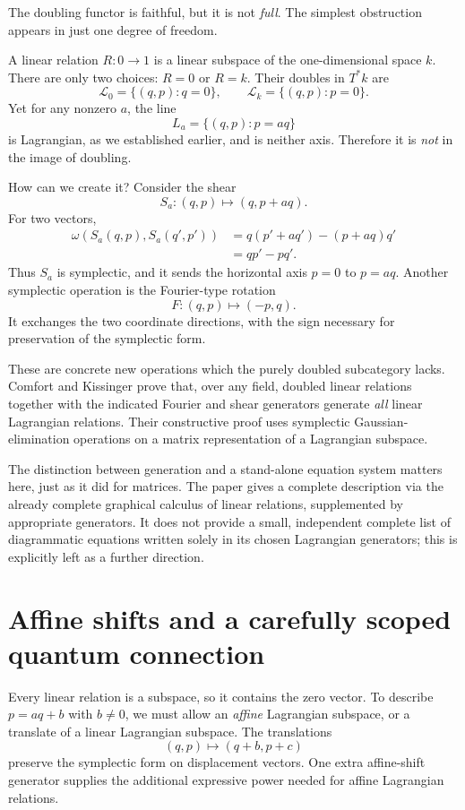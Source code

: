 The doubling functor is faithful, but it is not \emph{full}. The simplest obstruction appears in just one degree of freedom.

A linear relation \(R:0\to1\) is a linear subspace of the one-dimensional space \(k\). There are only two choices: \(R=0\) or \(R=k\). Their doubles in \(T^*k\) are
\[
 \mathcal L_{0}=\{(q,p):q=0\},\qquad
 \mathcal L_k=\{(q,p):p=0\}.
\]
Yet for any nonzero \(a\), the line
\[
 L_a=\{(q,p):p=aq\}
\]
is Lagrangian, as we established earlier, and is neither axis. Therefore it is \emph{not} in the image of doubling.

How can we create it? Consider the shear
\[
 S_a:(q,p)\longmapsto(q,p+aq).
\]
For two vectors,
\[
 \begin{aligned}
 \omega(S_a(q,p),S_a(q',p'))
 &=q(p'+aq')-(p+aq)q'\\
 &=qp'-pq'.
 \end{aligned}
\]
Thus \(S_a\) is symplectic, and it sends the horizontal axis \(p=0\) to \(p=aq\). Another symplectic operation is the Fourier-type rotation
\[
 F:(q,p)\longmapsto(-p,q).
\]
It exchanges the two coordinate directions, with the sign necessary for preservation of the symplectic form.

These are concrete new operations which the purely doubled subcategory lacks. Comfort and Kissinger prove that, over any field, doubled linear relations together with the indicated Fourier and shear generators generate \emph{all} linear Lagrangian relations. Their constructive proof uses symplectic Gaussian-elimination operations on a matrix representation of a Lagrangian subspace.

The distinction between generation and a stand-alone equation system matters here, just as it did for matrices. The paper gives a complete description via the already complete graphical calculus of linear relations, supplemented by appropriate generators. It does not provide a small, independent complete list of diagrammatic equations written solely in its chosen Lagrangian generators; this is explicitly left as a further direction.

\section{Affine shifts and a carefully scoped quantum connection}

Every linear relation is a subspace, so it contains the zero vector. To describe \(p=aq+b\) with \(b\ne0\), we must allow an \emph{affine} Lagrangian subspace, or a translate of a linear Lagrangian subspace. The translations
\[
 (q,p)\longmapsto(q+b,p+c)
\]
preserve the symplectic form on displacement vectors. One extra affine-shift generator supplies the additional expressive power needed for affine Lagrangian relations.

